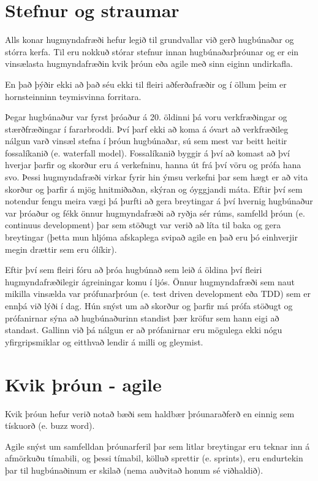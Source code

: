 \section{Stefnur og straumar}
Alls konar hugmyndafræði hefur legið til grundvallar við gerð hugbúnaðar og stórra kerfa.
Til eru nokkuð stórar stefnur innan hugbúnaðarþróunar og er ein vinsælasta hugmyndafræðin kvik þróun eða agile með sinn eiginn undirkafla.

En það þýðir ekki að það séu ekki til fleiri aðferðafræðir og í öllum þeim er hornsteinninn teymisvinna forritara.

Þegar hugbúnaður var fyrst þróaður á 20. öldinni þá voru verkfræðingar og stærðfræðingar í fararbroddi.
Því þarf ekki að koma á óvart að verkfræðileg nálgun varð vinsæl stefna í þróun hugbúnaðar, sú sem mest var beitt heitir fossalíkanið (e. waterfall model).
Fossalíkanið byggir á því að komast að því hverjar þarfir og skorður eru á verkefninu, hanna út frá því vöru og prófa hana svo.
Þessi hugmyndafræði virkar fyrir hin ýmsu verkefni þar sem hægt er að vita skorður og þarfir á mjög hnitmiðaðan, skýran og óyggjandi máta.
Eftir því sem notendur fengu meira vægi þá þurfti að gera breytingar á því hvernig hugbúnaður var þróaður og fékk önnur hugmyndafræði að ryðja sér rúms, samfelld þróun (e. continuus development) þar sem stöðugt var verið að líta til baka og gera breytingar (þetta mun hljóma afskaplega svipað agile en það eru þó einhverjir megin drættir sem eru ólíkir). 

Eftir því sem fleiri fóru að þróa hugbúnað sem leið á öldina því fleiri hugmyndafræðilegir ágreiningar komu í ljós.
Önnur hugmyndafræði sem naut mikilla vinsælda var prófunarþróun (e. test driven development eða TDD) sem er ennþá við lýði í dag.
Hún snýst um að skorður og þarfir má prófa stöðugt og prófanirnar sýna að hugbúnaðurinn standist þær kröfur sem hann eigi að standast.
Gallinn við þá nálgun er að prófanirnar eru mögulega ekki nógu yfirgripsmiklar og eitthvað lendir á milli og gleymist.

\section{Kvik þróun - agile}
Kvik þróun hefur verið notað bæði sem haldbær þróunaraðferð en einnig sem tískuorð (e. buzz word).

Agile snýst um samfelldan þróunarferil þar sem litlar breytingar eru teknar inn á afmörkuðu tímabili, og þessi tímabil, kölluð sprettir (e. sprints), eru endurtekin þar til hugbúnaðinum er skilað (nema auðvitað honum sé viðhaldið).


